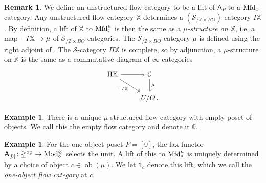 \documentclass[10pt]{amsart}
\numberwithin{equation}{section}
\theoremstyle{definition}
\newtheorem{ex}[prop]{Example}
\newtheorem{rem}[prop]{Remark}
\DeclareMathOperator{\Mod}{Mod}
\DeclareMathOperator{\ob}{ob}
\DeclareMathOperator{\op}{op}
\newcommand{\Mfd}{\mathrm{Mfd}\vphantom{d}}
\newcommand{\bZ}{\mathbb{Z}}
\newcommand{\bX}{\mathbb{X}}
\newcommand{\bOne}{\mathbb{1}}
\newcommand{\bZero}{\mathbb{0}}
\newcommand{\Simp}{\mathbb{\Delta}}
\newcommand{\cC}{\mathcal{C}}
\newcommand{\cS}{\mathcal{S}}
\newcommand{\sfA}{\mathsf{A}}
\renewcommand{\to}{\mathchoice{\longrightarrow}{\rightarrow}{}{}}
\begin{document}
\begin{rem}
	We define an unstructured flow category to be a lift of $\sfA_{P}$ to a $\Mfd_{\diamond}$-category.
  Any unstructured flow category $\bX$ determines a $(\cS_{/ \bZ\times BO})$-category $I\bX$.
  By definition, a lift of $\bX$ to $\Mfd_{\diamond}^{\mu}$ is then the same as a \emph{$\mu$-structure on $\bX$}, i.e. a map $-I\bX \to \mu$ of $\cS_{/ \bZ\times BO}$-categories.
  The $\cS_{/ \bZ\times BO}$-category $\mu$ is defined using the right adjoint of .
  The $\cS$-category $\Pi\bX$ is complete, so by adjunction, a $\mu$-structure on $\bX$ is the same as a commutative diagram of $\infty$-categories
	\begin{equation*}
		\begin{tikzcd}
			\Pi\bX \arrow[r] \arrow[dr,"-I\bX"']      &   \cC  \arrow[d, "\mu"] \\
	               &  U/O\,.
		\end{tikzcd}
	\end{equation*}
\end{rem}

\begin{ex}\label{ex:empty_flow_cat}
	There is a unique $\mu$-structured flow category with empty poset of objects.
	We call this the empty flow category and denote it $\bZero$.
\end{ex}

\begin{ex}\label{ex:one_object_flow_cat}
	For the one-object poset $P=[0]$, the lax functor $\sfA_{[0]} \colon \Simp^{\op} \to \Mod_{\diamond}^{\otimes}$ selects the unit.
  A lift of this to $\Mfd_{\diamond}^{\mu}$ is uniquely determined by a choice of object $c\in \ob(\mu)$.
  We let $\bOne_{c}$ denote this lift, which we call the \emph{one-object flow category} at $c$.
\end{ex}
\end{document}
